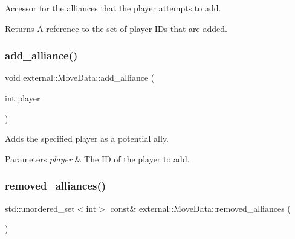 Accessor for the alliances that the player attempts to add. 

\begin{DoxyReturn}{Returns}
A reference to the set of player I\+Ds that are added. 
\end{DoxyReturn}
\mbox{\label{classexternal_1_1_move_data_ae3a11d3c816e165ac2ceff604f191d32}} 
\subsubsection{\texorpdfstring{add\+\_\+alliance()}{add\_alliance()}}
{\footnotesize\ttfamily void external\+::\+Move\+Data\+::add\+\_\+alliance (\begin{DoxyParamCaption}\item[{int}]{player }\end{DoxyParamCaption})\hspace{0.3cm}{\ttfamily [inline]}}



Adds the specified player as a potential ally. 


\begin{DoxyParams}{Parameters}
{\em player} & The ID of the player to add. \\
\hline
\end{DoxyParams}
\mbox{\label{classexternal_1_1_move_data_addc5f0e83d4c41edab01fe2e804b3eeb}} 
\subsubsection{\texorpdfstring{removed\+\_\+alliances()}{removed\_alliances()}}
{\footnotesize\ttfamily std\+::unordered\+\_\+set$<$int$>$ const\& external\+::\+Move\+Data\+::removed\+\_\+alliances (\begin{DoxyParamCaption}{ }\end{DoxyParamCaption})\hspace{0.3cm}{\ttfamily [inline]}}




